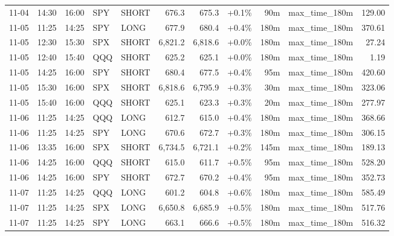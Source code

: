 \documentclass[11pt,a4paper,twoside]{article}
\begin{document}
\begin{center}
\begin{longtable}{>{\color{txtmain}}l l l l l r r r r >{\color{txtmain}}l r}
11-04 & 14:30 & 16:00 & SPY & SHORT & 676.3 & 675.3 & \textcolor{wingreen}{+0.1\%} & 90m & max\_time\_180m & \textcolor{wingreen}{129.00} \\
11-05 & 11:25 & 14:25 & SPY & LONG & 677.9 & 680.4 & \textcolor{wingreen}{+0.4\%} & 180m & max\_time\_180m & \textcolor{wingreen}{370.61} \\
11-05 & 12:30 & 15:30 & SPX & SHORT & 6,821.2 & 6,818.6 & \textcolor{wingreen}{+0.0\%} & 180m & max\_time\_180m & \textcolor{wingreen}{27.24} \\
11-05 & 12:40 & 15:40 & QQQ & SHORT & 625.2 & 625.1 & \textcolor{wingreen}{+0.0\%} & 180m & max\_time\_180m & \textcolor{wingreen}{1.19} \\
11-05 & 14:25 & 16:00 & SPY & SHORT & 680.4 & 677.5 & \textcolor{wingreen}{+0.4\%} & 95m & max\_time\_180m & \textcolor{wingreen}{420.60} \\
11-05 & 15:30 & 16:00 & SPX & SHORT & 6,818.6 & 6,795.9 & \textcolor{wingreen}{+0.3\%} & 30m & max\_time\_180m & \textcolor{wingreen}{323.06} \\
11-05 & 15:40 & 16:00 & QQQ & SHORT & 625.1 & 623.3 & \textcolor{wingreen}{+0.3\%} & 20m & max\_time\_180m & \textcolor{wingreen}{277.97} \\
11-06 & 11:25 & 14:25 & QQQ & LONG & 612.7 & 615.0 & \textcolor{wingreen}{+0.4\%} & 180m & max\_time\_180m & \textcolor{wingreen}{368.66} \\
11-06 & 11:25 & 14:25 & SPY & LONG & 670.6 & 672.7 & \textcolor{wingreen}{+0.3\%} & 180m & max\_time\_180m & \textcolor{wingreen}{306.15} \\
11-06 & 13:35 & 16:00 & SPX & SHORT & 6,734.5 & 6,721.1 & \textcolor{wingreen}{+0.2\%} & 145m & max\_time\_180m & \textcolor{wingreen}{189.13} \\
11-06 & 14:25 & 16:00 & QQQ & SHORT & 615.0 & 611.7 & \textcolor{wingreen}{+0.5\%} & 95m & max\_time\_180m & \textcolor{wingreen}{528.20} \\
11-06 & 14:25 & 16:00 & SPY & SHORT & 672.7 & 670.2 & \textcolor{wingreen}{+0.4\%} & 95m & max\_time\_180m & \textcolor{wingreen}{352.73} \\
11-07 & 11:25 & 14:25 & QQQ & LONG & 601.2 & 604.8 & \textcolor{wingreen}{+0.6\%} & 180m & max\_time\_180m & \textcolor{wingreen}{585.49} \\
11-07 & 11:25 & 14:25 & SPX & LONG & 6,650.8 & 6,685.9 & \textcolor{wingreen}{+0.5\%} & 180m & max\_time\_180m & \textcolor{wingreen}{517.76} \\
11-07 & 11:25 & 14:25 & SPY & LONG & 663.1 & 666.6 & \textcolor{wingreen}{+0.5\%} & 180m & max\_time\_180m & \textcolor{wingreen}{516.32} \\

\end{longtable}
\end{center}
\end{document}
